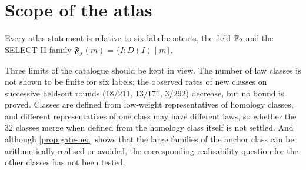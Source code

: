 \section{Scope of the atlas}
Every atlas statement is relative to six-label contents, the field $\mathbb{F}_2$ and the SELECT-II family $\mathfrak F_\lambda(m)=\{I:D(I)\mid m\}$.
Three limits of the catalogue should be kept in view. The number of law classes is not shown to be finite for six labels; the observed rates of new classes on successive held-out rounds ($18/211$, $13/171$, $3/292$) decrease, but no bound is proved. Classes are defined from low-weight representatives of homology classes, and different representatives of one class may have different laws, so whether the $32$ classes merge when defined from the homology class itself is not settled. And although \cref{prop:gate-nec} shows that the large families of the anchor class can be arithmetically realised or avoided, the corresponding realisability question for the other classes has not been tested.
